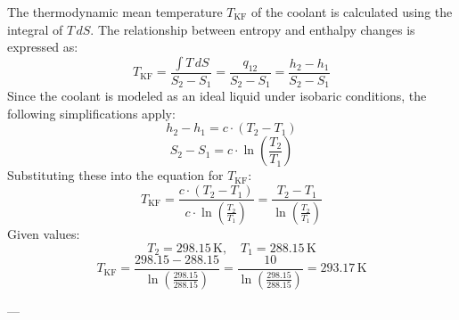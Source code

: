The thermodynamic mean temperature \( T_{\text{KF}} \) of the coolant is calculated using the integral of \( T \, dS \). The relationship between entropy and enthalpy changes is expressed as:  
\[
T_{\text{KF}} = \frac{\int T \, dS}{S_2 - S_1} = \frac{q_{12}}{S_2 - S_1} = \frac{h_2 - h_1}{S_2 - S_1}
\]  
Since the coolant is modeled as an ideal liquid under isobaric conditions, the following simplifications apply:  
\[
h_2 - h_1 = c \cdot (T_2 - T_1)
\]  
\[
S_2 - S_1 = c \cdot \ln\left(\frac{T_2}{T_1}\right)
\]  
Substituting these into the equation for \( T_{\text{KF}} \):  
\[
T_{\text{KF}} = \frac{c \cdot (T_2 - T_1)}{c \cdot \ln\left(\frac{T_2}{T_1}\right)} = \frac{T_2 - T_1}{\ln\left(\frac{T_2}{T_1}\right)}
\]  
Given values:  
\[
T_2 = 298.15 \, \text{K}, \quad T_1 = 288.15 \, \text{K}
\]  
\[
T_{\text{KF}} = \frac{298.15 - 288.15}{\ln\left(\frac{298.15}{288.15}\right)} = \frac{10}{\ln\left(\frac{298.15}{288.15}\right)} = 293.17 \, \text{K}
\]  

---